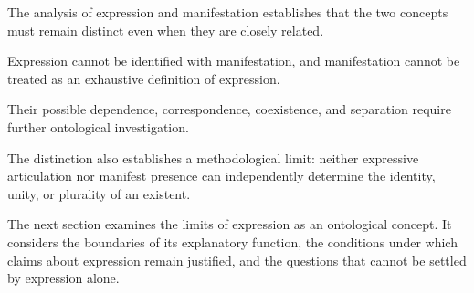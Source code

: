 The analysis of expression and manifestation establishes
that the two concepts must remain distinct even when
they are closely related.

Expression cannot be identified with manifestation,
and manifestation cannot be treated as an exhaustive
definition of expression.

Their possible dependence, correspondence, coexistence,
and separation require further ontological investigation.

The distinction also establishes a methodological limit:
neither expressive articulation nor manifest presence
can independently determine the identity, unity, or
plurality of an existent.

The next section examines the limits of expression
as an ontological concept. It considers the boundaries
of its explanatory function, the conditions under which
claims about expression remain justified, and the
questions that cannot be settled by expression alone.

